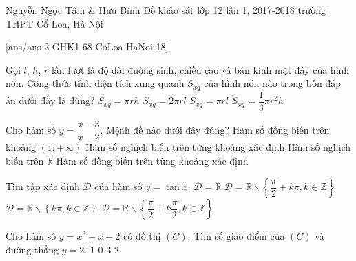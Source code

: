 \begin{name}
{Nguyễn Ngọc Tâm \& Hữu Bình}
{Đề khảo sát lớp 12 lần 1, 2017-2018 trường THPT Cổ Loa, Hà Nội}
\end{name}
\setcounter{ex}{0}
[ans/ans-2-GHK1-68-CoLoa-HaNoi-18]

\begin{ex}%
Gọi $l$, $h$, $r$ lần lượt là độ dài đường sinh, chiều cao và bán kính mặt đáy của hình nón. Công thức tính diện tích xung quanh $S_{xq}$ của hình nón nào trong bốn đáp án dưới đây là đúng?
\choice
{$S_{xq}=\pi rh$}
{$S_{xq}=2\pi rl$}
{\True $S_{xq}=\pi rl$}
{$S_{xq}=\dfrac{1}{3}\pi r^2h$}
\end{ex}

\begin{ex}%
Cho hàm số $y=\dfrac{x-3}{x-2}$. Mệnh đề nào dưới đây đúng?
\choice
{Hàm số đồng biến trên khoảng $\left( {1;+\infty} \right)$}
{Hàm số nghịch biến trên từng khoảng xác định}
{Hàm số nghịch biến trên $\mathbb{R}$}
{\True Hàm số đồng biến trên từng khoảng xác định}
\end{ex}

\begin{ex}%
Tìm tập xác định $\mathscr{D}$ của hàm số $y=\tan x$.
\choice
{$\mathscr{D}=\mathbb{R}$}
{\True $\mathscr{D}=\mathbb{R} \backslash \left\{ {\dfrac{\pi}{2}+k\pi,k \in \mathbb{Z}} \right\}$}
{$\mathscr{D}=\mathbb{R} \backslash \left\{ {k\pi,k \in \mathbb{Z}} \right\}$}
{$\mathscr{D}=\mathbb{R} \backslash \left\{ {\dfrac{\pi}{2}+k\dfrac{\pi}{2},k \in \mathbb{Z}} \right\}$}
\end{ex}

\begin{ex}%
Cho hàm số $y=x^3+x+2$ có đồ thị $\left( {C} \right)$. Tìm số giao điểm của $\left( {C} \right)$ và đường thẳng $y=2$. 
\choice
{\True $1$}
{$0$}
{$3$}
{$2$}
\end{ex}

